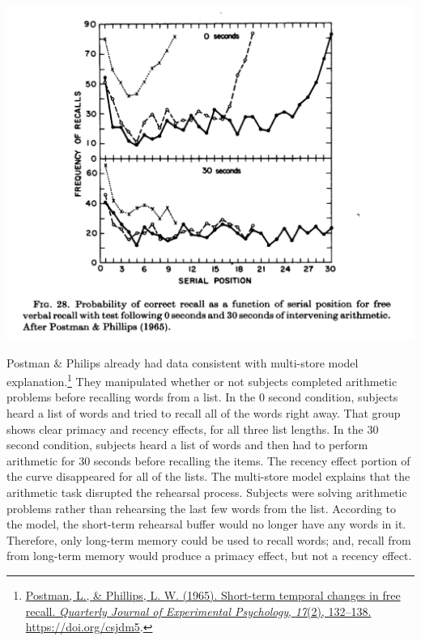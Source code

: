 \documentclass[
  oneside,
  12pt]{crumpbook}
\newenvironment{floatright50}{%
  \wrapfigure{R}{.5\textwidth}%
  }{%
  \endwrapfigure}
\begin{document}
\begin{floatright50}
\includegraphics[width=1\linewidth]{imgs/Serial_position_2}

\end{floatright50}

Postman \& Philips already had data consistent with multi-store model explanation.\footnote{\protect\hyperlink{ref-postmanShorttermTemporalChanges1965}{Postman, L., \& Phillips, L. W. (1965). Short-term temporal changes in free recall. \emph{Quarterly Journal of Experimental Psychology}, \emph{17}(2), 132--138. \url{https://doi.org/csjdm5}}.} They manipulated whether or not subjects completed arithmetic problems before recalling words from a list. In the 0 second condition, subjects heard a list of words and tried to recall all of the words right away. That group shows clear primacy and recency effects, for all three list lengths. In the 30 second condition, subjects heard a list of words and then had to perform arithmetic for 30 seconds before recalling the items. The recency effect portion of the curve disappeared for all of the lists. The multi-store model explains that the arithmetic task disrupted the rehearsal process. Subjects were solving arithmetic problems rather than rehearsing the last few words from the list. According to the model, the short-term rehearsal buffer would no longer have any words in it. Therefore, only long-term memory could be used to recall words; and, recall from from long-term memory would produce a primacy effect, but not a recency effect.
\end{document}
